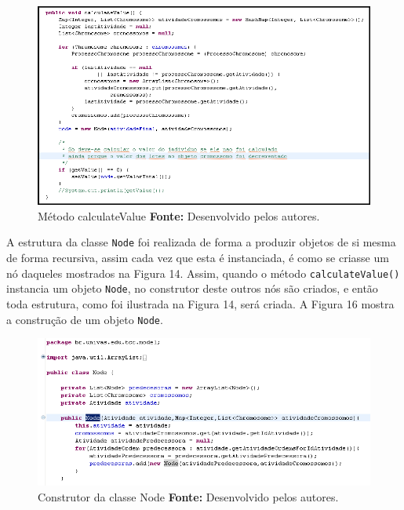 \newpage

\begin{figure}[h!]
	\centerline{\includegraphics[scale=0.7]{./imagens/codigo_calculate_value.png}}
	\caption[Distribuição de trabalho]
	{Método calculateValue \textbf{Fonte:} Desenvolvido pelos autores.}
	\label{fig:exemplo1}
\end{figure}

\par A estrutura da classe \texttt{Node} foi realizada de forma a produzir objetos de si mesma de forma recursiva, assim 
cada vez que esta é instanciada, é como se criasse um nó daqueles
mostrados na Figura 14.
Assim, quando o método \texttt{calculateValue()} instancia um objeto
\texttt{Node}, no construtor deste outros nós são criados, e então toda
estrutura, como foi ilustrada na Figura 14, será criada.
A Figura 16 mostra a construção de um objeto \texttt{Node}. 

\begin{figure}[h!]
	\centerline{\includegraphics[scale=0.8]{./imagens/node_class.png}}
	\caption[Distribuição de trabalho]
	{Construtor da classe Node \textbf{Fonte:} Desenvolvido pelos autores.}
	\label{fig:exemplo1}
\end{figure}



